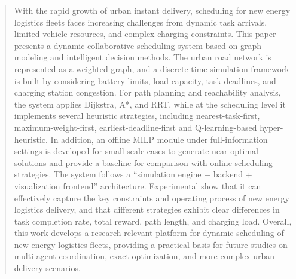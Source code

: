 
\begin{abstract}
   With the rapid growth of urban instant delivery, scheduling for new energy logistics fleets faces increasing challenges from dynamic task arrivals, limited vehicle resources, and complex charging constraints. This paper presents a dynamic collaborative scheduling system based on graph modeling and intelligent decision methods. The urban road network is represented as a weighted graph, and a discrete-time simulation framework is built by considering battery limits, load capacity, task deadlines, and charging station congestion. 
   For path planning and reachability analysis, the system applies Dijkstra, A*, and RRT, while at the scheduling level it implements several heuristic strategies, including nearest-task-first, maximum-weight-first, earliest-deadline-first and Q-learning-based hyper-heuristic. 
   In addition, an offline MILP module under full-information settings is developed for small-scale cases to generate near-optimal solutions and provide a baseline for comparison with online scheduling strategies. 
   The system follows a “simulation engine + backend + visualization frontend” architecture. Experimental show that it can effectively capture the key constraints and operating process of new energy logistics delivery, and that different strategies exhibit clear differences in task completion rate, total reward, path length, and charging load. 
   Overall, this work develops a research-relevant platform for dynamic scheduling of new energy logistics fleets, providing a practical basis for future studies on multi-agent coordination, exact optimization, and more complex urban delivery scenarios.
\end{abstract}